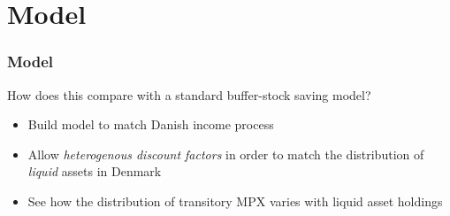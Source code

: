 \documentclass{beamer}
\begin{document}
\section{Model}
\frame
{
	\frametitle{Model}
	How does this compare with a standard buffer-stock saving model?
	\begin{itemize}
		\item Build model to match Danish income process
		\item Allow \textit{heterogenous discount factors} in order to match the distribution of \textit{liquid} assets in Denmark
		\item See how the distribution of transitory MPX varies with liquid asset holdings
	\end{itemize}

}
\end{document}
